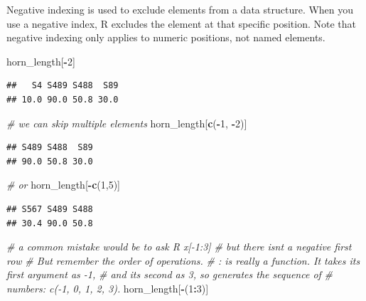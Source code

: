\documentclass[
]{book}
\newenvironment{Shaded}{\begin{snugshade}}{\end{snugshade}}
\newcommand{\CommentTok}[1]{\textcolor[rgb]{0.56,0.35,0.01}{\textit{#1}}}
\newcommand{\DecValTok}[1]{\textcolor[rgb]{0.00,0.00,0.81}{#1}}
\newcommand{\FunctionTok}[1]{\textcolor[rgb]{0.13,0.29,0.53}{\textbf{#1}}}
\newcommand{\NormalTok}[1]{#1}
\newcommand{\SpecialCharTok}[1]{\textcolor[rgb]{0.81,0.36,0.00}{\textbf{#1}}}
\begin{document}
Negative indexing is used to exclude elements from a data structure. When you use a negative index, R excludes the element at that specific position. Note that negative indexing only applies to numeric positions, not named elements.

\begin{Shaded}
\begin{Highlighting}[]
\NormalTok{horn\_length[}\SpecialCharTok{{-}}\DecValTok{2}\NormalTok{]}
\end{Highlighting}
\end{Shaded}

\begin{verbatim}
##   S4 S489 S488  S89 
## 10.0 90.0 50.8 30.0
\end{verbatim}

\begin{Shaded}
\begin{Highlighting}[]
\CommentTok{\# we can skip multiple elements}
\NormalTok{horn\_length[}\FunctionTok{c}\NormalTok{(}\SpecialCharTok{{-}}\DecValTok{1}\NormalTok{, }\SpecialCharTok{{-}}\DecValTok{2}\NormalTok{)]  }
\end{Highlighting}
\end{Shaded}

\begin{verbatim}
## S489 S488  S89 
## 90.0 50.8 30.0
\end{verbatim}

\begin{Shaded}
\begin{Highlighting}[]
\CommentTok{\# or }
\NormalTok{horn\_length[}\SpecialCharTok{{-}}\FunctionTok{c}\NormalTok{(}\DecValTok{1}\NormalTok{,}\DecValTok{5}\NormalTok{)]}
\end{Highlighting}
\end{Shaded}

\begin{verbatim}
## S567 S489 S488 
## 30.4 90.0 50.8
\end{verbatim}

\begin{Shaded}
\begin{Highlighting}[]
\CommentTok{\# a common mistake would be to ask R x[{-}1:3] \# but there isn\textquotesingle{}t a negative first row}
\CommentTok{\# But remember the order of operations. }
\CommentTok{\# : is really a function. It takes its first argument as {-}1, }
\CommentTok{\# and its second as 3, so generates the sequence of }
\CommentTok{\# numbers: c({-}1, 0, 1, 2, 3).}
\NormalTok{horn\_length[}\SpecialCharTok{{-}}\NormalTok{(}\DecValTok{1}\SpecialCharTok{:}\DecValTok{3}\NormalTok{)]}
\end{Highlighting}
\end{Shaded}
\end{document}
